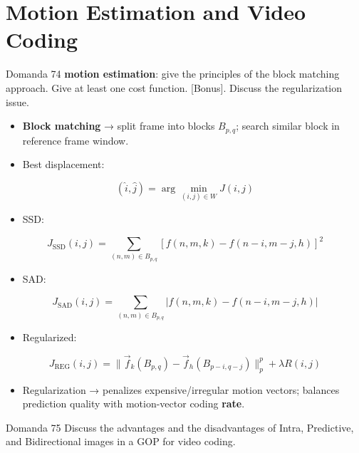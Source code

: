 \section{Motion Estimation and Video Coding}




\begin{questionbox}{Domanda 74}
\textbf{motion estimation}: give the principles of the block matching approach. Give at least one cost function. [Bonus]. Discuss the regularization issue.
\end{questionbox}


\begin{itemize}
  \item \textbf{Block matching} → split frame into blocks $B_{p,q}$; search similar block in reference frame window.
  \item Best displacement:
\end{itemize}


$$
(\hat{i},\hat{j})=\arg\min_{(i,j)\in W}J(i,j)
$$


\begin{itemize}
  \item SSD:
\end{itemize}


$$
J_{\text{SSD}}(i,j)=
\sum_{(n,m)\in B_{p,q}}
[f(n,m,k)-f(n-i,m-j,h)]^2
$$


\begin{itemize}
  \item SAD:
\end{itemize}


$$
J_{\text{SAD}}(i,j)=
\sum_{(n,m)\in B_{p,q}}
|f(n,m,k)-f(n-i,m-j,h)|
$$


\begin{itemize}
  \item Regularized:
\end{itemize}


$$
J_{\text{REG}}(i,j)=
\|\vec{f}_k(B_{p,q})-\vec{f}_h(B_{p-i,q-j})\|_p^p
+\lambda R(i,j)
$$


\begin{itemize}
  \item Regularization → penalizes expensive/irregular motion vectors; balances prediction quality with motion-vector coding \textbf{rate}.
\end{itemize}



\begin{questionbox}{Domanda 75}
Discuss the advantages and the disadvantages of Intra, Predictive, and Bidirectional images in a GOP for video coding.
\end{questionbox}



